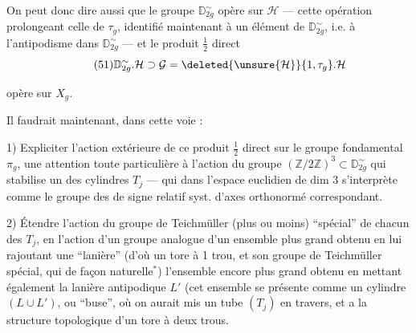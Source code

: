 On peut donc dire aussi que le groupe $\mathbb D_{2g}^\sim$
opère sur $\mathcal H$ --- cette opération prolongeant celle
de $\tau_g$, identifié maintenant à un
élément de $\mathbb D_{2g}^\sim$, i.e. à l'antipodisme dans
$\mathbb D_{2g}^\sim$ --- et le produit $\frac12$ direct
\[
\tag{51}
\mathbb D_{2g}^\sim.\mathcal H\supset\mathcal G
=\deleted{\unsure{\mathcal H}}\{1,\tau_g\}.\mathcal H
\]



opère sur $X_g$.

Il faudrait maintenant, dans cette voie :

1) Expliciter l'action extérieure de ce produit $\frac12$ direct sur le groupe fondamental $\pi_g$,  une attention toute particulière à l'action du groupe $(\mathbb Z/2\mathbb Z)^3\subset\mathbb D_{2g}^{\sim}$ qui stabilise un des cylindres $T_j$ --- qui dans l'espace euclidien de dim 3 s'interprète comme le groupe des  de signe relatif  syst. d'axes orthonormé correspondant.

2) Étendre l'action  du groupe de Teichmüller (plus ou moins) ``spécial'' de chacun des $T_j$, en l'action d'un groupe analogue d'un ensemble plus grand obtenu en lui rajoutant une ``lanière''  (d'où un tore à 1 trou, et son groupe de Teichmüller spécial, qui  de façon naturelle$^*$)  l'ensemble encore plus grand obtenu en mettant également la lanière antipodique $L'$ (cet ensemble se présente comme un cylindre $(L\cup L')$, ou ``buse'', où on aurait mis un tube $(T_j)$ en travers, et a la structure topologique d'un tore à deux trous.

